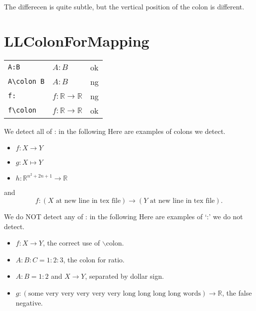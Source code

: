 \documentclass[a4paper]{article}
\newcommand{\tA}[1]{\textcolor{cA}{#1}}
\newcommand{\tD}[1]{\textcolor{cD}{#1}}
\begin{document}
The differecen is quite subtle, but the vertical position of the colon is different.

\section{LLColonForMapping}

\begin{table}[H]
	\centering
	\begin{tabular}{lll}
		\verb|A:B|       & $A:B$                               & \tA{ok} \\
		\verb|A\colon B| & $A\colon B$                         & \tD{ng} \\
		\verb|f:|        & $f:\mathbb{R} \to \mathbb{R}$       & \tD{ng} \\
		\verb|f\colon|   & $f\colon \mathbb{R} \to \mathbb{R}$ & \tA{ok}
	\end{tabular}
\end{table}

\begin{itembox}{We detect all of : in the following}
	Here are examples of colons we detect.
	\begin{itemize}
		\item $f:X \to Y$
		\item \( g: X \mapsto Y \)
		\item $h : \mathbb{R}^{n^2 + 2n + 1} \rightarrow \mathbb{R}$
	\end{itemize}
	and
	\begin{equation} \label{eq:sample}
		f:
		(X \text{ at new line in tex file})
		\to
		(Y \text{ at new line in tex file}).
	\end{equation}
\end{itembox}

\vspace{\baselineskip}

\begin{itembox}{We do NOT detect any of : in the following}
	Here are examples of `:' we do not detect.
	\begin{itemize}
		\item $f\colon X \to Y$, the correct use of $\backslash$colon.
		\item $A:B:C = 1:2:3$, the colon for ratio.
		\item $A:B = 1:2$ and $X \to Y$, separated by dollar sign.
		\item $g: (\text{some very very very very very long long long long words}) \to \mathbb{R}$, the false negative.
	\end{itemize}
\end{itembox}
\end{document}
